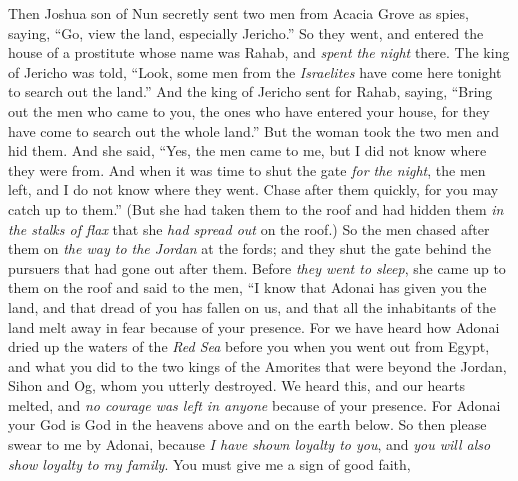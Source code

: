 \begin{biblechapter} %
 Then Joshua son of Nun secretly sent two men from Acacia Grove as spies, saying, “Go, view the land, especially Jericho.” So they went, and entered the house of a prostitute whose name was Rahab, and \textit{spent the night} there.
\verse The king of Jericho was told, “Look, some men from the \textit{Israelites} have come here tonight to search out the land.”
\verse And the king of Jericho sent for Rahab, saying, “Bring out the men who came to you, the ones who have entered your house, for they have come to search out the whole land.”
\verse But the woman took the two men and hid them. And she said, “Yes, the men came to me, but I did not know where they were from.
\verse And when it was time to shut the gate \textit{for the night}, the men left, and I do not know where they went. Chase after them quickly, for you may catch up to them.”
\verse (But she had taken them to the roof and had hidden them \textit{in the stalks of flax} that she \textit{had spread out} on the roof.)
\verse So the men chased after them on \textit{the way to the Jordan} at the fords; and they shut the gate behind the pursuers that had gone out after them.
\verse Before \textit{they went to sleep}, she came up to them on the roof
\verse and said to the men, “I know that Adonai has given you the land, and that dread of you has fallen on us, and that all the inhabitants of the land melt away in fear because of your presence.
\verse For we have heard how Adonai dried up the waters of the \textit{Red Sea} before you when you went out from Egypt, and what you did to the two kings of the Amorites that were beyond the Jordan, Sihon and Og, whom you utterly destroyed.
\verse We heard this, and our hearts melted, and \textit{no courage was left in anyone} because of your presence. For Adonai your God is God in the heavens above and on the earth below.
\verse So then please swear to me by Adonai, because \textit{I have shown loyalty to you}, and \textit{you will also show loyalty} \textit{to my family}. You must give me a sign of good faith,

\end{biblechapter}
